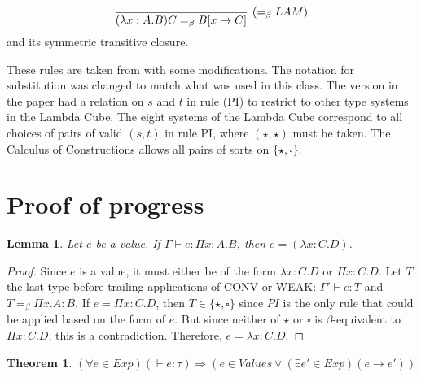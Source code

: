 \documentclass{article}
\newtheorem{theorem}{Theorem}
\newtheorem{lemma}{Lemma}
\begin{document}
\[\infer[(=_\beta LAM)]{(\lambda x:A.B)C=_\beta B[x\mapsto C]}{}\]
and its symmetric transitive closure.

These rules are taken from \cite{Jones97} with some modifications. The notation for substitution was changed to match what was used in this class. The version in the paper had a relation on $s$ and $t$ in rule (PI) to restrict to other type systems in the Lambda Cube. The eight systems of the Lambda Cube correspond to all choices of pairs of valid $(s,t)$ in rule PI, where $(\star,\star)$ must be taken. The Calculus of Constructions allows all pairs of sorts on $\{\star,\square\}$.

\section{Proof of progress}

\begin{lemma}
  Let $e$ be a value.
  If $\Gamma\vdash e:\Pi x:A.B$, then $e=(\lambda x:C.D)$.
\end{lemma}

\begin{proof}
  Since $e$ is a value, it must either be of the form $\lambda x:C.D$ or $\Pi x:C.D$. Let $T$ the last type before trailing applications of CONV or WEAK: $\Gamma'\vdash e:T$ and $T=_\beta \Pi x.A:B$. If $e=\Pi x:C.D$, then $T\in\{\star,\square\}$ since $PI$ is the only rule that could be applied based on the form of $e$. But since neither of $\star$ or $\square$ is $\beta$-equivalent to $\Pi x:C.D$, this is a contradiction. Therefore, $e=\lambda x:C.D$.

\end{proof}
  
\begin{theorem}
  $(\forall e \in Exp)(\vdash e:\tau)\Rightarrow(e \in Values\vee(\exists e'\in Exp)(e\rightarrow e'))$
\end{theorem}
\end{document}
